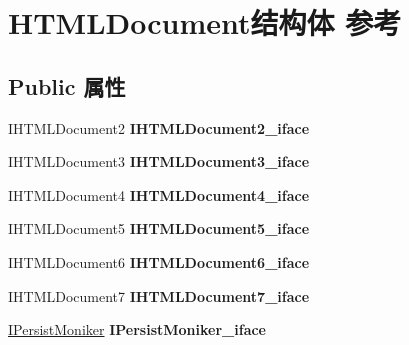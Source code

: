 \hypertarget{struct_h_t_m_l_document}{}\section{H\+T\+M\+L\+Document结构体 参考}
\label{struct_h_t_m_l_document}
\subsection*{Public 属性}
\begin{DoxyCompactItemize}
\item 
\mbox{\label{struct_h_t_m_l_document_a5ac6f5b6419b4df2fcb0ded9db48063f}} 
I\+H\+T\+M\+L\+Document2 {\bfseries I\+H\+T\+M\+L\+Document2\+\_\+iface}
\item 
\mbox{\label{struct_h_t_m_l_document_a2a1604e857c6237f9515b9a3adc1afc5}} 
I\+H\+T\+M\+L\+Document3 {\bfseries I\+H\+T\+M\+L\+Document3\+\_\+iface}
\item 
\mbox{\label{struct_h_t_m_l_document_ae8a64c71e18ffb6dd8e5223e6a09fd32}} 
I\+H\+T\+M\+L\+Document4 {\bfseries I\+H\+T\+M\+L\+Document4\+\_\+iface}
\item 
\mbox{\label{struct_h_t_m_l_document_a7ef784ca56f42d3c6413237f73991126}} 
I\+H\+T\+M\+L\+Document5 {\bfseries I\+H\+T\+M\+L\+Document5\+\_\+iface}
\item 
\mbox{\label{struct_h_t_m_l_document_a857d84c7aef54f316396ab253d596aac}} 
I\+H\+T\+M\+L\+Document6 {\bfseries I\+H\+T\+M\+L\+Document6\+\_\+iface}
\item 
\mbox{\label{struct_h_t_m_l_document_a11e4acc30f1fcff0569dfbdeb9750a48}} 
I\+H\+T\+M\+L\+Document7 {\bfseries I\+H\+T\+M\+L\+Document7\+\_\+iface}
\item 
\mbox{\label{struct_h_t_m_l_document_a5c97ed855c5d48bf89829ed2b6ceb8bb}} 
\hyperlink{interface_i_persist_moniker}{I\+Persist\+Moniker} {\bfseries I\+Persist\+Moniker\+\_\+iface}
\item 
\mbox{\label{struct_h_t_m_l_document_a122a6f65a2678aa6ffbe8ac1766d8d49}} 

\end{DoxyCompactItemize}
